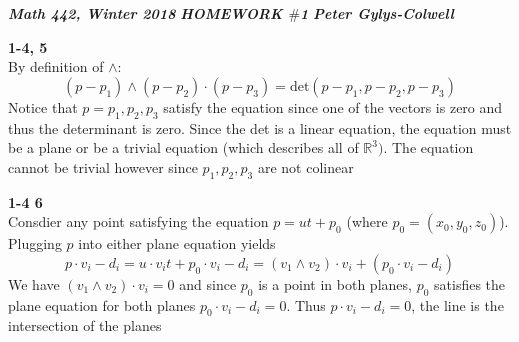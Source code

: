 \documentclass[12pt]{article}
\newenvironment{ques}[1]{\textbf{#1}\vspace{1 mm}\\ }{\bigskip}
\theoremstyle{definition}
\newcommand{\R}{\mathbb R}
\renewcommand{\det}{\text{det}}
\begin{document}
\noindent \textit{\textbf{Math 442, Winter 2018}} \hspace{1.3cm}
\textit{\textbf{HOMEWORK $\#$1}} \hspace{1.3cm} \textit{\textbf{Peter
Gylys-Colwell}} 

\vspace{1cm}

\begin{ques}{1-4, 5}
	By definition of $\wedge$:
	$$(p-p_1)\wedge (p-p_2)\cdot (p-p_3) = \det(p-p_1,p-p_2,p-p_3)$$
	Notice that $p=p_1,p_2,p_3$ satisfy the equation since one of the vectors
	is zero and thus the determinant is zero. Since the det is a linear
	equation, the equation must be a plane or be a trivial equation (which
	describes all of $\R^3)$. The equation cannot be trivial however since
	$p_1,p_2,p_3$ are not colinear
\end{ques}

\begin{ques}{1-4 6}
	Consdier any point satisfying the equation $p = ut + p_0$ (where $p_0 =
	(x_0,y_0, z_0)$). Plugging $p$ into either plane equation yields
	$$p \cdot v_i - d_i = u \cdot v_i t + p_0 \cdot v_i - d_i = (v_1 \wedge
	v_2) \cdot v_i +(p_0\cdot v_i - d_i)$$
	We have $(v_1 \wedge v_2) \cdot v_i = 0$ and since $p_0$ is a point in both
	planes, $p_0$ satisfies the plane equation for both planes $p_0 \cdot v_i -
	d_i = 0$. Thus $p \cdot v_i - d_i = 0$, the line is the intersection of the planes
\end{ques}
\end{document}
